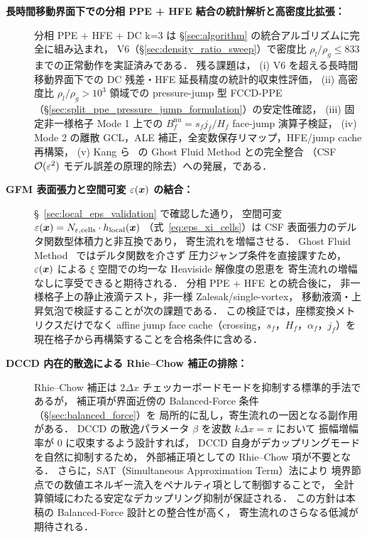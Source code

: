 \begin{description}
  \item[\textbf{長時間移動界面下での分相 PPE + HFE 結合の統計解析と高密度比拡張：}]
        分相 PPE + HFE + DC k=3 は §\ref{sec:algorithm} の統合アルゴリズムに完全に組み込まれ，
        V6（§\ref{sec:density_ratio_sweep}）で密度比 $\rho_l/\rho_g \le 833$ までの正常動作を実証済みである．
        残る課題は，
        (i) V6 を超える長時間移動界面下での DC 残差・HFE 延長精度の統計的収束性評価，
        (ii) 高密度比 $\rho_l/\rho_g > 10^3$ 領域での pressure-jump 型 FCCD-PPE
        （§\ref{sec:split_ppe_pressure_jump_formulation}）の安定性確認，
        (iii) 固定非一様格子 Mode 1 上での
        $B_f^{\mathrm{nu}}=s_fj_f/H_f$ face-jump 演算子検証，
        (iv) Mode 2 の離散 GCL，ALE 補正，全変数保存リマップ，HFE/jump cache 再構築，
        (v) Kang ら~\cite{Kang2000} の Ghost Fluid Method との完全整合
        （CSF $\mathcal{O}(\varepsilon^2)$ モデル誤差の原理的除去）への発展，である．

  \item[\textbf{GFM 表面張力と空間可変 \texorpdfstring{$\varepsilon(\bm{x})$}{eps(x)} の結合：}]
        §~\ref{sec:local_eps_validation} で確認した通り，
        空間可変 $\varepsilon(\bm{x}) = N_{\varepsilon,\text{cells}} \cdot h_{\mathrm{local}}(\bm{x})$
        （式~\eqref{eq:eps_xi_cells}）は
        CSF 表面張力のデルタ関数型体積力と非互換であり，
        寄生流れを増幅させる．
        Ghost Fluid Method~\cite{Kang2000} ではデルタ関数を介さず
        圧力ジャンプ条件を直接課すため，
        $\varepsilon(\bm{x})$ による $\xi$ 空間での均一な Heaviside 解像度の恩恵を
        寄生流れの増幅なしに享受できると期待される．
        分相 PPE + HFE との統合後に，
        非一様格子上の静止液滴テスト，非一様 Zalesak/single-vortex，
        移動液滴・上昇気泡で検証することが次の課題である．
        この検証では，座標変換メトリクスだけでなく
        affine jump face cache（crossing，$s_f$，$H_f$，$\alpha_f$，$j_f$）を
        現在格子から再構築することを合格条件に含める．

  \item[\textbf{DCCD 内在的散逸による Rhie--Chow 補正の排除：}]
        Rhie--Chow 補正は $2\Delta x$ チェッカーボードモードを抑制する標準的手法であるが，
        補正項が界面近傍の Balanced-Force 条件（§\ref{sec:balanced_force}）を
        局所的に乱し，寄生流れの一因となる副作用がある．
        DCCD の散逸パラメータ $\beta$ を波数 $k\Delta x = \pi$ において
        振幅増幅率が $0$ に収束するよう設計すれば，
        DCCD 自身がデカップリングモードを自然に抑制するため，
        外部補正項としての Rhie--Chow 項が不要となる．
        さらに，SAT（Simultaneous Approximation Term）法により
        境界節点での数値エネルギー流入をペナルティ項として制御することで，
        全計算領域にわたる安定なデカップリング抑制が保証される．
        この方針は本稿の Balanced-Force 設計との整合性が高く，
        寄生流れのさらなる低減が期待される．
\end{description}

